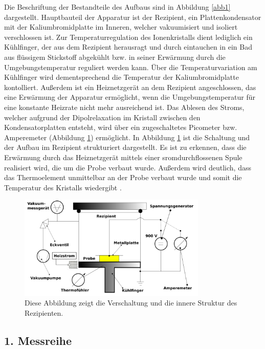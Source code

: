 Die Beschriftung der Bestandteile des Aufbaus sind in Abbildung \ref{abb1} dargestellt.
Hauptbauteil der Apparatur ist der Rezipient, ein Plattenkondensator mit der Kaliumbromidplatte
im Inneren, welcher vakuumisiert und isoliert verschlossen ist. 
Zur Temperaturregulation des Ionenkristalls dient lediglich ein Kühlfinger, 
der aus dem Rezipient herausragt und durch eintauchen in ein Bad aus flüssigem 
Stickstoff abgekühlt bzw. in seiner Erwärmung durch die Umgebungstemperatur reguliert 
werden kann. Über die Temperaturvariation am Kühlfinger wird dementsprechend die 
Temperatur der Kaliumbromidplatte kontolliert. 
Außerdem ist ein Heiznetzgerät an dem Rezipient angeschlossen, das eine Erwärmung 
der Apparatur ermöglicht, wenn die Umgebungstemperatur für eine konstante 
Heizrate nicht mehr ausreichend ist. 
Das Ablesen des Stroms, welcher aufgrund der Dipolrelaxation im Kristall zwischen 
den Kondensatorplatten entsteht, wird über ein zugeschaltetes Picometer 
bzw. Amperemeter (Abbildung \ref{abb2}) ermöglicht.
In Abbildung \ref{abb2} ist die Schaltung und der Aufbau im Rezipient strukturiert 
dargestellt. Es ist zu erkennen, dass die Erwärmung durch das Heiznetzgerät 
mittels einer sromdurchflossenen Spule realisiert wird, die um die Probe
verbaut wurde. Außerdem wird deutlich, dass das Thermoelement unmittelbar an 
der Probe verbaut wurde und somit die Temperatur des Kristalls wiedergibt \cite{sample}. 

\begin{figure}
    \centering
    \includegraphics[width=0.8\textwidth, keepaspectratio]{figure/AufbauSkizze.png}
    \caption{Diese Abbildung zeigt die Verschaltung und die innere Struktur 
    des Rezipienten. 
    \cite{sample}}
    \label{abb2}
\end{figure}

\subsection{1. Messreihe}

